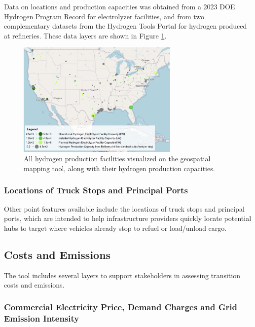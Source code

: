 Data on locations and production capacities was obtained from a 2023 DOE Hydrogen Program Record \cite{Hydrogen2023ElectrolyzerInstallations} for electrolyzer facilities, and from two complementary datasets \cite{H2ToolsCaptiveHydrogenProduction,H2ToolsMerchantHydrogenCapacities} from the Hydrogen Tools Portal \cite{H2Tools} for hydrogen produced at refineries. These data layers are shown in Figure \ref{fig:hydrogen_facilities}.

\begin{figure}[ht]
        \centering
        \includegraphics[width=0.7\textwidth]{figures/hydrogen_production_facilities.png}
        \caption{All hydrogen production facilities visualized on the geospatial mapping tool, along with their hydrogen production capacities.}
        \label{fig:hydrogen_facilities}
\end{figure}

\subsubsection{Locations of Truck Stops and Principal Ports}

Other point features available include the locations of truck stops and principal ports, which are intended to help infrastructure providers quickly locate potential hubs to target where vehicles already stop to refuel or load/unload cargo. 

\subsection{Costs and Emissions}

The tool includes several layers to support stakeholders in assessing transition costs and emissions. 

\subsubsection{Commercial Electricity Price, Demand Charges and Grid Emission Intensity}
\label{sec:elec_price_emissions_intensity}

